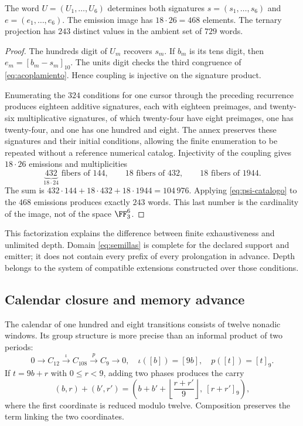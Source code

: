 \begin{proposition}
The word \(U=(U_1,\ldots,U_6)\) determines both signatures \(s=(s_1,\ldots,s_6)\) and \(e=(e_1,\ldots,e_6)\). The emission image has \(18\cdot26=468\) elements. The ternary projection has \(243\) distinct values in the ambient set of \(729\) words.
\end{proposition}
\begin{proof}
The hundreds digit of \(U_m\) recovers \(s_m\). If \(b_m\) is its tens digit, then \(e_m=[b_m-s_m]_{10}\). The units digit checks the third congruence of \eqref{eq:acoplamiento}. Hence coupling is injective on the signature product.

Enumerating the \(324\) conditions for one cursor through the preceding recurrence produces eighteen additive signatures, each with eighteen preimages, and twenty-six multiplicative signatures, of which twenty-four have eight preimages, one has twenty-four, and one has one hundred and eight. The annex preserves these signatures and their initial conditions, allowing the finite enumeration to be repeated without a reference numerical catalog. Injectivity of the coupling gives \(18\cdot26\) emissions and multiplicities
\[
 \underbrace{432}_{18\cdot24}\text{ fibers of }144,
 \qquad18\text{ fibers of }432,
 \qquad18\text{ fibers of }1944.
\]
The sum is \(432\cdot144+18\cdot432+18\cdot1944=104\,976\). Applying \eqref{eq:psi-catalogo} to the \(468\) emissions produces exactly \(243\) words. This last number is the cardinality of the image, not of the space \(\FF_3^6\).
\end{proof}

This factorization explains the difference between finite exhaustiveness and unlimited depth. Domain \eqref{eq:semillas} is complete for the declared support and emitter; it does not contain every prefix of every prolongation in advance. Depth belongs to the system of compatible extensions constructed over those conditions.

\subsection{Calendar closure and memory advance}

The calendar of one hundred and eight transitions consists of twelve nonadic windows. Its group structure is more precise than an informal product of two periods:
\begin{equation}
 0\longrightarrow C_{12}\xrightarrow{\iota}C_{108}
 \xrightarrow{p}C_9\longrightarrow0,
 \quad\iota([b])=[9b],\quad p([t])=[t]_9.
 \label{eq:extension108}
\end{equation}
If \(t=9b+r\) with \(0\le r<9\), adding two phases produces the carry
\[
 (b,r)+(b',r')=
 \left(b+b'+\left\lfloor\frac{r+r'}9\right\rfloor,\ [r+r']_9\right),
\]
where the first coordinate is reduced modulo twelve. Composition preserves the term linking the two coordinates.

